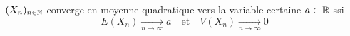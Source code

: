\begin{corollary}
    $(X_n)_{n \in \mathbb{N}}$ converge en moyenne quadratique vers la variable certaine $a \in \mathbb{R}$ ssi
        \[ E(X_n) \underset{n \to \infty}{\longrightarrow} a \quad \text{et} \quad V(X_n) \underset{n \to \infty}{\longrightarrow} 0 \] 
\end{corollary}


